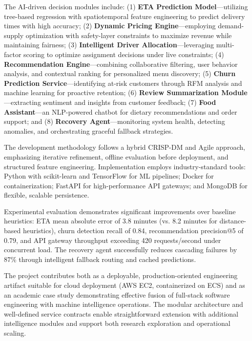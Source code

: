 \documentclass[12pt,a4paper]{report}
\begin{document}
The AI-driven decision modules include: (1) \textbf{ETA Prediction Model}---utilizing tree-based regression with spatiotemporal feature engineering to predict delivery times with high accuracy; (2) \textbf{Dynamic Pricing Engine}---employing demand-supply optimization with safety-layer constraints to maximize revenue while maintaining fairness; (3) \textbf{Intelligent Driver Allocation}---leveraging multi-factor scoring to optimize assignment decisions under live constraints; (4) \textbf{Recommendation Engine}---combining collaborative filtering, user behavior analysis, and contextual ranking for personalized menu discovery; (5) \textbf{Churn Prediction Service}---identifying at-risk customers through RFM analysis and machine learning for proactive retention; (6) \textbf{Review Summarization Module}---extracting sentiment and insights from customer feedback; (7) \textbf{Food Assistant}---an NLP-powered chatbot for dietary recommendations and order support; and (8) \textbf{Recovery Agent}---monitoring system health, detecting anomalies, and orchestrating graceful fallback strategies.

The development methodology follows a hybrid CRISP-DM and Agile approach, emphasizing iterative refinement, offline evaluation before deployment, and structured feature engineering. Implementation employs industry-standard tools: Python with scikit-learn and TensorFlow for ML pipelines; Docker for containerization; FastAPI for high-performance API gateways; and MongoDB for flexible, scalable persistence.

Experimental evaluation demonstrates significant improvements over baseline heuristics: ETA mean absolute error of 3.8 minutes (vs. 8.2 minutes for distance-based heuristics), churn detection recall of 0.84, recommendation precision@5 of 0.79, and API gateway throughput exceeding 420 requests/second under concurrent load. The recovery agent successfully reduces cascading failures by 87\% through intelligent fallback routing and cached predictions.

The project contributes both as a deployable, production-oriented engineering artifact suitable for cloud deployment (AWS EC2, containerized on ECS) and as an academic case study demonstrating effective fusion of full-stack software engineering with machine intelligence operations. The modular architecture and well-defined service contracts enable straightforward extension with additional intelligence modules and support both research exploration and operational scaling.
\end{document}
